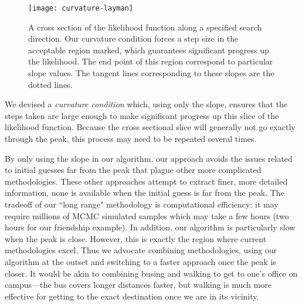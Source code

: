 \documentclass[12pt]{article}
\begin{document}
\begin{figure}[h!]
\centering
\texttt{[image: curvature-layman]}
\caption{A cross section of the likelihood function along a specified search direction.
Our curvature condition forces a step size in the 
acceptable region marked, which guarantees significant progress up the likelihood.
The end point of this region correspond to particular slope values.  
The tangent lines corresponding to these slopes are the dotted lines.
}
\label{F:curvature}
\end{figure}

We devised a \emph{curvature condition} which, using only the slope, ensures 
that the steps taken are large enough to make significant progress up this 
slice of the likelihood function.  Because the cross sectional slice will generally
not go exactly through the peak, this process may need to be repeated several times.

By only using the slope in our algorithm, our approach avoids 
the issues related to initial guesses far from the peak that plague other 
more complicated methodologies.  These other approaches attempt to extract
finer, more detailed information, none is available when the initial guess is far
from the peak.
The tradeoff of our ``long range" methodology is computational efficiency:
it may require millions of MCMC simulated samples 
which may take a few hours (two hours for our friendship example). In
addition, our algorithm is particularly slow when the peak 
is close.  However, this is exactly the region
where current methodologies excel.  Thus we advocate combining methodologies, 
using our algorithm at the outset and switching 
to a faster approach once the peak is closer.  It would 
be akin to combining busing and walking to get to one's office on campus---the 
bus covers longer distances faster, but walking is much more effective for getting
to the exact destination once we are in its vicinity.
\end{document}
